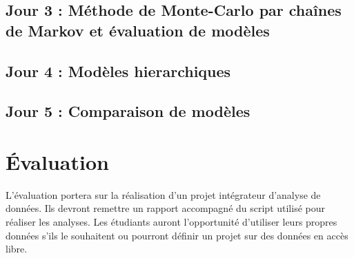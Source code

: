 \documentclass[12]{article}
\begin{document}

  \subsection*{Jour 3 : Méthode de Monte-Carlo par chaînes de Markov et évaluation de modèles}


  \subsection*{Jour 4 : Modèles hierarchiques}


  \subsection*{Jour 5 : Comparaison de modèles}


	\section*{Évaluation}

	L'évaluation portera sur la réalisation d'un projet intégrateur d'analyse de
	données. Ils devront remettre un rapport accompagné du script utilisé pour
	réaliser les analyses. Les étudiants auront l'opportunité d'utiliser leurs
	propres données s'ils le souhaitent ou pourront définir un projet sur des
	données en accès libre.

\end{document}

